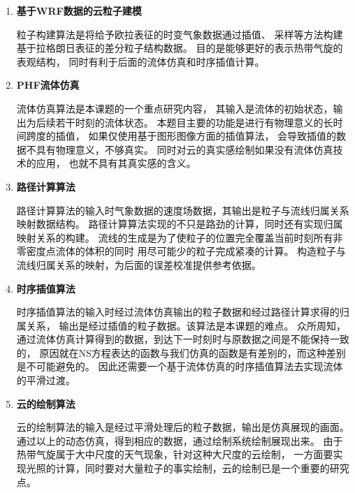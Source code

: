 \begin{enumerate}

\item \textbf{基于WRF数据的云粒子建模}

粒子构建算法是将给予欧拉表征的时变气象数据通过插值、
采样等方法构建基于拉格朗日表征的差分粒子结构数据。
目的是能够更好的表示热带气旋的表观结构，
同时有利于后面的流体仿真和时序插值计算。

\item \textbf{PHF流体仿真}

流体仿真算法是本课题的一个重点研究内容，
其输入是流体的初始状态，输出为后续若干时刻的流体状态。
本题目主要的功能是进行有物理意义的长时间跨度的插值，
如果仅使用基于图形图像方面的插值算法，
会导致插值的数据不具有物理意义，不够真实。
同时对云的真实感绘制如果没有流体仿真技术的应用，
也就不具有其真实感的含义。

\item \textbf{路径计算算法}

路径计算算法的输入时气象数据的速度场数据，其输出是粒子与流线归属关系映射数据结构。
路径计算算法实现的不只是路劲的计算，同时还有实现归属映射关系的构建。
流线的生成是为了使粒子的位置完全覆盖当前时刻所有非零密度点流体的体积的同时
用尽可能少的粒子完成紧凑的计算。
构造粒子与流线归属关系的映射，为后面的误差校准提供参考依据。

\item \textbf{时序插值算法}

时序插值算法的输入时经过流体仿真输出的粒子数据和经过路径计算求得的归属关系，
输出是经过插值的粒子数据。该算法是本课题的难点。
众所周知，通过流体仿真计算得到的数据，到达下一时刻时与原数据之间是不能保持一致的，
原因就在NS方程表达的函数与我们仿真的函数是有差别的，而这种差别是不可能避免的。
因此还需要一个基于流体仿真的时序插值算法去实现流体的平滑过渡。

\item \textbf{云的绘制算法}

云的绘制算法的输入是经过平滑处理后的粒子数据，输出是仿真展现的画面。
通过以上的动态仿真，得到相应的数据，通过绘制系统绘制展现出来。
由于热带气旋属于大中尺度的天气现象，针对这种大尺度的云绘制，
一方面要实现光照的计算，同时要对大量粒子的事实绘制，云的绘制已是一个重要的研究点。

\end{enumerate}



